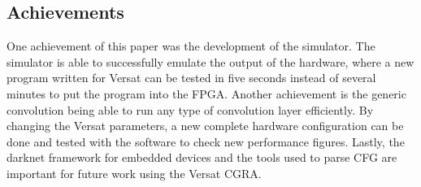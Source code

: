 \documentclass[conference]{IEEEtran}
\begin{document}
\subsection{Achievements}
\label{section:achievements}

One achievement of this paper was the development of the simulator. The simulator is able
to successfully emulate the output of the hardware, where a new program written for Versat
can be tested in five seconds instead of several minutes to put the program into the FPGA.
Another achievement is the generic convolution being able to run any type of convolution layer
efficiently. By changing the Versat parameters, a new complete hardware configuration can be
done and tested with the software to check new performance figures.
Lastly, the darknet framework for embedded devices and the tools used to parse CFG
are important for future work using the Versat CGRA.







	
	
	
\end{document}
